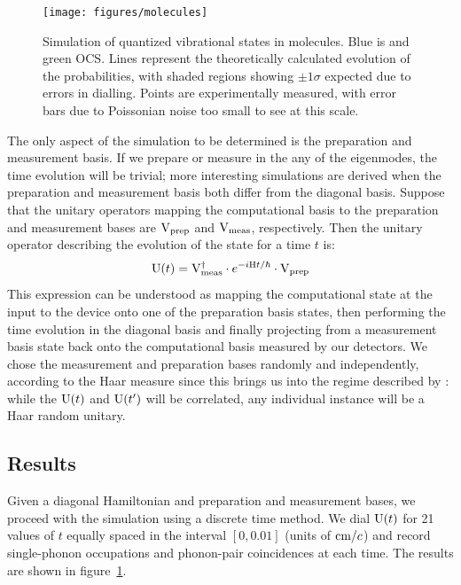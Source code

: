 \begin{figure}
  \centering
  \texttt{[image: figures/molecules]}
  \caption[Simulation of quantized vibrational states in molecules]
  {Simulation of quantized vibrational states in molecules. Blue is \co{} and
  green OCS. Lines represent the theoretically calculated evolution of the
  probabilities, with shaded regions showing \(\pm 1 \sigma\) expected due to
  errors in dialling. Points are experimentally measured, with error bars due to
  Poissonian noise too small to see at this scale.}
  \label{fig:molecules}
\end{figure}

The only aspect of the simulation to be determined is the preparation and
measurement basis. If we prepare or measure in the any of the eigenmodes, the
time evolution will be trivial; more interesting simulations are derived when
the preparation and measurement basis both differ from the diagonal basis.
Suppose that the unitary
operators mapping the computational basis to the preparation and measurement
bases are \(\mathrm{V}_{\text{prep}}\) and \(\mathrm{V}_{\text{meas}}\), respectively. Then the
unitary operator describing the evolution of
the state for a time \(t\) is:
\begin{equation}
  \mathrm{U} \!\left(t\right) = \mathrm{V}_{\text{meas}}^{\dagger} \cdot e^{-i \mathrm{H} t/\hbar} \cdot
  \mathrm{V}_{\text{prep}}
\end{equation}
This expression can be understood as mapping the computational state at the
input to the device onto one of the preparation basis states, then performing
the time evolution in the diagonal basis and finally projecting from a
measurement basis state back onto the computational basis measured by our
detectors. We chose the measurement and preparation bases randomly and
independently, according to the Haar measure since this brings us into the
regime described by \bosonsampling{}: while the \(\mathrm{U} \!\left(t\right)\) and \(\mathrm{U}
\!\left(t^{\prime}\right) \) will be correlated, any individual instance will be a Haar
random unitary.

\subsection{Results}
Given a diagonal Hamiltonian and preparation and measurement bases, we proceed
with the simulation using a discrete time method. We dial \(\mathrm{U} \!\left(t\right)\) for
21 values of \(t\) equally spaced in the interval \(\left[0,0.01\right]\)
(units of \(\text{cm} / c\)) and record single-phonon occupations and
phonon-pair coincidences at each time. The results are shown in
figure~\ref{fig:molecules}.

